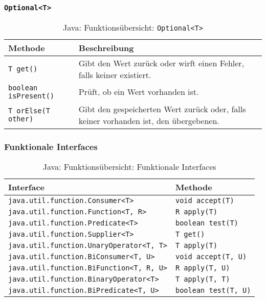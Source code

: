         \subsubsection{\texttt{Optional<T>}}
            \label{java:optional}
            \begin{sidewaystable}
                \centering
                \begin{tabular}{l | l}
                    Methode & Beschreibung \\
                    \hline
                    \texttt{T get()} & Gibt den Wert zurück oder wirft einen Fehler, falls keiner existiert. \\
                    \texttt{boolean isPresent()} & Prüft, ob ein Wert vorhanden ist. \\
                    \texttt{T orElse(T other)} & Gibt den gespeicherten Wert zurück oder, falls keiner vorhanden ist, den übergebenen. \\
                \end{tabular}
                \caption{Java: Funktionsübersicht: \texttt{Optional<T>}}
            \end{sidewaystable}


        \subsubsection{Funktionale Interfaces}
            \label{java:funcinterf}
            \begin{sidewaystable}
                \centering
                \begin{tabular}{l | l}
                    Interface & Methode \\
                    \hline
                    \texttt{java.util.function.Consumer<T>} & \texttt{void accept(T)} \\
                    \texttt{java.util.function.Function<T, R>} & \texttt{R apply(T)} \\
                    \texttt{java.util.function.Predicate<T>} & \texttt{boolean test(T)} \\
                    \texttt{java.util.function.Supplier<T>} & \texttt{T get()} \\
                    \texttt{java.util.function.UnaryOperator<T, T>} & \texttt{T apply(T)} \\
                    \texttt{java.util.function.BiConsumer<T, U>} & \texttt{void accept(T, U)} \\
                    \texttt{java.util.function.BiFunction<T, R, U>} & \texttt{R apply(T, U)} \\
                    \texttt{java.util.function.BinaryOperator<T>} & \texttt{T apply(T, T)} \\
                    \texttt{java.util.function.BiPredicate<T, U>} & \texttt{boolean test(T, U)} \\
                \end{tabular}
                \caption{Java: Funktionsübersicht: Funktionale Interfaces}
            \end{sidewaystable}
